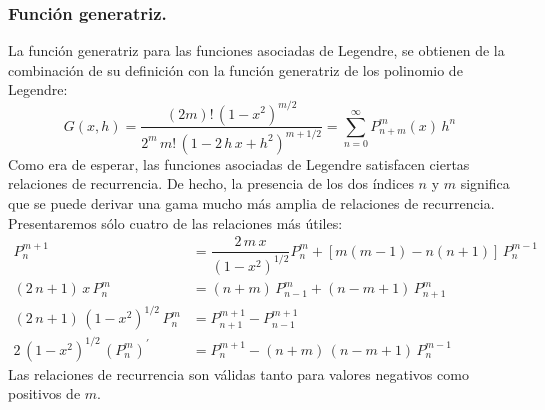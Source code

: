 \subsubsection{Función generatriz.}
La función generatriz para las funciones asociadas de Legendre, se obtienen de la combinación de su definición con la función generatriz de los polinomio de Legendre:
\begin{equation}
G(x,h) = \dfrac{(2m)! \, (1 - x^{2})^{m/2}}{2^{m} \, m! \, (1 - 2 \, h \, x + h^{2})^{m+1/2}} = \sum_{n=0}^{\infty} P_{n+m}^{m} (x) \, h^{n}
\label{eq:ecuacion_18_40}
\end{equation}
Como era de esperar, las funciones asociadas de Legendre satisfacen ciertas relaciones de recurrencia. De hecho, la presencia de los dos índices $n$ y $m$ significa que se puede derivar una gama mucho más amplia de relaciones de recurrencia. Presentaremos sólo cuatro de las relaciones más útiles:
\begin{align*}
P_{n}^{m+1} &= \dfrac{2 \, m \, x}{(1-x^{2})^{1/2}} P_{n}^{m} + [m(m - 1) - n (n + 1)] \, P_{n}^{m-1} \\
(2 \, n + 1) \, x \, P_{n}^{m} &= (n + m) \, P_{n-1}^{m} + (n - m + 1) \, P_{n+1}^{m} \\
(2 \, n + 1) \, (1 -  x^{2})^{1/2} \, P_{n}^{m} &= P_{n+1}^{m+1} - P_{n-1}^{m+1} \\
2 \, (1 - x^{2})^{1/2} \, (P_{n}^{m})^{\prime} &= P_{n}^{m+1} - (n + m) \, (n - m + 1) \, P_{n}^{m-1}
\end{align*}
Las relaciones de recurrencia son válidas tanto para valores negativos como positivos de $m$.

